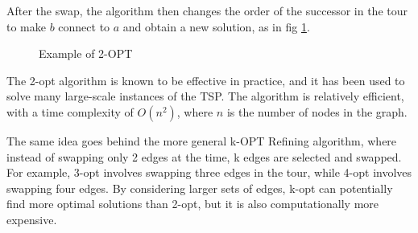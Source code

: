 After the swap, the algorithm then changes the order of the successor in the tour to make $b$ connect to $a$ and obtain a new solution, as in fig \ref{fig:2OPT}.

\begin{figure}[!h]
    \centering
    \caption{Example of 2-OPT} \label{fig:2OPT}
\end{figure}

The 2-opt algorithm is known to be effective in practice, and it has been used to solve many large-scale instances of the TSP. The algorithm is relatively efficient, with a time complexity of $O(n^2)$, where $n$ is the number of nodes in the graph.

The same idea goes behind the more general k-OPT Refining algorithm, where instead of swapping only 2 edges at the time, k edges are selected and swapped. For example, 3-opt involves swapping three edges in the tour, while 4-opt involves swapping four edges. By considering larger sets of edges, k-opt can potentially find more optimal solutions than 2-opt, but it is also computationally more expensive.






	



